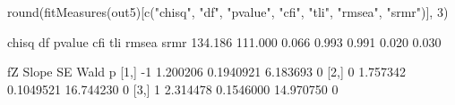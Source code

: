 \begin{Schunk}
\begin{Sinput}
 round(fitMeasures(out5)[c("chisq", "df", "pvalue", "cfi", 
                           "tli", "rmsea", "srmr")], 3)
\end{Sinput}
\begin{Soutput}
  chisq      df  pvalue     cfi     tli   rmsea    srmr 
134.186 111.000   0.066   0.993   0.991   0.020   0.030 
\end{Soutput}
\begin{Soutput}
     fZ    Slope        SE      Wald p
[1,] -1 1.200206 0.1940921  6.183693 0
[2,]  0 1.757342 0.1049521 16.744230 0
[3,]  1 2.314478 0.1546000 14.970750 0
\end{Soutput}
\end{Schunk}
